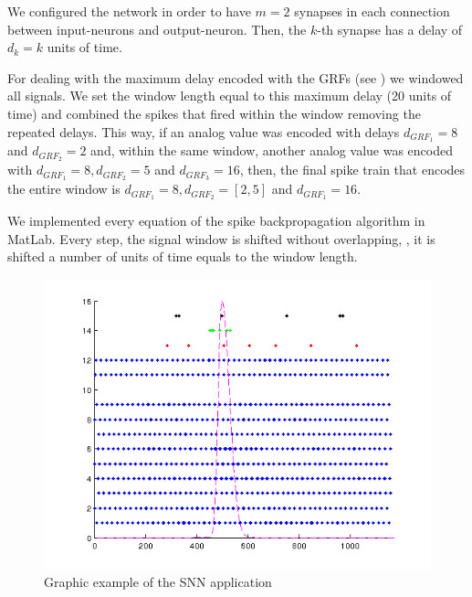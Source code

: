 We configured the network in order to have $m=2$ synapses in each connection between input-neurons and output-neuron. Then, the $k$-th synapse has a delay of $d_{k}=k$ units of time.

For dealing with the maximum delay encoded with the GRFs (see ) we windowed all signals. We set the window length equal to this maximum delay (20 units of time) and combined the spikes that fired within the window removing the repeated delays. This way, if an analog value was encoded with delays $d_{GRF_{1}}=8$ and $d_{GRF_{2}}=2$ and, within the same window, another analog value was encoded with $d_{GRF_{1}}=8,d_{GRF_{2}}=5$ and $d_{GRF_{3}}=16$, then, the final spike train that encodes the entire window is $d_{GRF_{1}}=8, d_{GRF_{2}}=[2,5]$ and $d_{GRF_{1}}=16$. 

We implemented every equation of the spike backpropagation algorithm in MatLab. Every step, the signal window is shifted without overlapping, \ie, it is shifted a number of units of time equals to the window length. 
\begin{figure}[!ht]
\centering
\includegraphics[width=0.85\columnwidth]{images/results/snn1.png}
\caption{Graphic example of the SNN application}
\label{fig:snnResults}
\end{figure}


